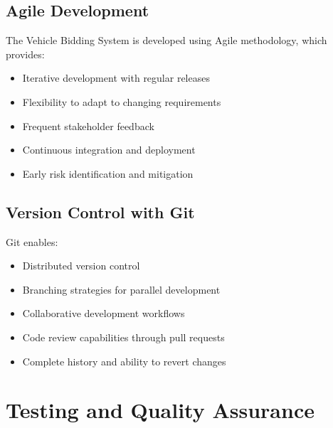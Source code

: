 \subsection{Agile Development}

The Vehicle Bidding System is developed using Agile methodology, which provides:

\begin{itemize}
    \item Iterative development with regular releases
    \item Flexibility to adapt to changing requirements
    \item Frequent stakeholder feedback
    \item Continuous integration and deployment
    \item Early risk identification and mitigation
\end{itemize}

\subsection{Version Control with Git}

Git enables:

\begin{itemize}
    \item Distributed version control
    \item Branching strategies for parallel development
    \item Collaborative development workflows
    \item Code review capabilities through pull requests
    \item Complete history and ability to revert changes
\end{itemize}

\section{Testing and Quality Assurance}

